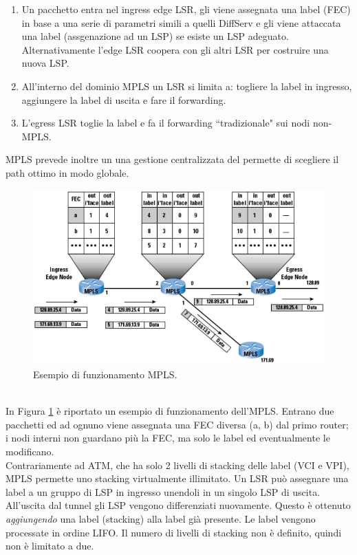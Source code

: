 \begin{enumerate}
	\item Un pacchetto entra nel ingress edge LSR, gli viene assegnata una label (FEC) in base a una serie di parametri simili a quelli DiffServ e gli viene attaccata una label (assgenazione ad un LSP) se esiste un LSP adeguato. Alternativamente l'edge LSR coopera con gli altri LSR per costruire una nuova LSP.
	\item All'interno del dominio MPLS un LSR si limita a: togliere la label in ingresso, aggiungere la label di uscita e fare il forwarding.
	\item L'egress LSR toglie la label e fa il forwarding \textquotedblleft tradizionale" sui nodi non-MPLS.
\end{enumerate}
MPLS prevede inoltre un una gestione centralizzata del permette di scegliere il path ottimo in modo globale.
\begin{figure}[htbp]
	\centering
	\includegraphics[scale = 0.4]{images/MPLS-example}
	\caption{Esempio di funzionamento MPLS.}
	\label{img:MPLS-example}
\end{figure}\\
In Figura \ref{img:MPLS-example} è riportato un esempio di funzionamento dell'MPLS. Entrano due pacchetti ed ad ognuno viene assegnata una FEC diversa (a, b) dal primo router; i nodi interni non guardano più la FEC, ma solo le label ed eventualmente le modificano.\\
Contrariamente ad ATM, che ha solo 2 livelli di stacking delle label (VCI e VPI), MPLS permette uno stacking virtualmente illimitato. Un LSR può assegnare una label a un gruppo di LSP in ingresso unendoli in un singolo LSP di uscita. All'uscita dal tunnel gli LSP vengono differenziati nuovamente. Questo è ottenuto \textit{aggiungendo} una label (stacking) alla label già presente. Le label vengono processate in ordine LIFO. Il numero di livelli di stacking non è definito, quindi non è limitato a due.
